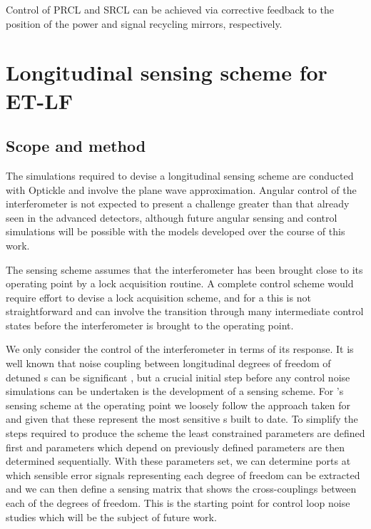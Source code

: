 Control of \gls{PRCL} and \gls{SRCL} can be achieved via corrective feedback to the position of the power and signal recycling mirrors, respectively.

\section{Longitudinal sensing scheme for ET-LF}

\subsection{Scope and method}
The simulations required to devise a longitudinal sensing scheme are conducted with Optickle and involve the plane wave approximation. Angular control of the interferometer is not expected to present a challenge greater than that already seen in the advanced detectors, although future angular sensing and control simulations will be possible with the models developed over the course of this work.

The sensing scheme assumes that the interferometer has been brought close to its operating point by a lock acquisition routine. A complete control scheme would require effort to devise a lock acquisition scheme, and for a \DRFPMI{} this is not straightforward and can involve the transition through many intermediate control states before the interferometer is brought to the operating point.

We only consider the control of the interferometer in terms of its response. It is well known that noise coupling between longitudinal degrees of freedom of detuned \DRFPMI{}s can be significant \cite{Hild2007}, but a crucial initial step before any control noise simulations can be undertaken is the development of a sensing scheme. For \ETLF{}'s sensing scheme at the operating point we loosely follow the approach taken for \ALIGO{} \cite{Abbott2010} and \AVIRGO{} \cite{Vajente2008} given that these represent the most sensitive \DRFPMI{}s built to date. To simplify the steps required to produce the scheme the least constrained parameters are defined first and parameters which depend on previously defined parameters are then determined sequentially. With these parameters set, we can determine ports at which sensible error signals representing each degree of freedom can be extracted and we can then define a sensing matrix that shows the cross-couplings between each of the degrees of freedom. This is the starting point for control loop noise studies which will be the subject of future work.

